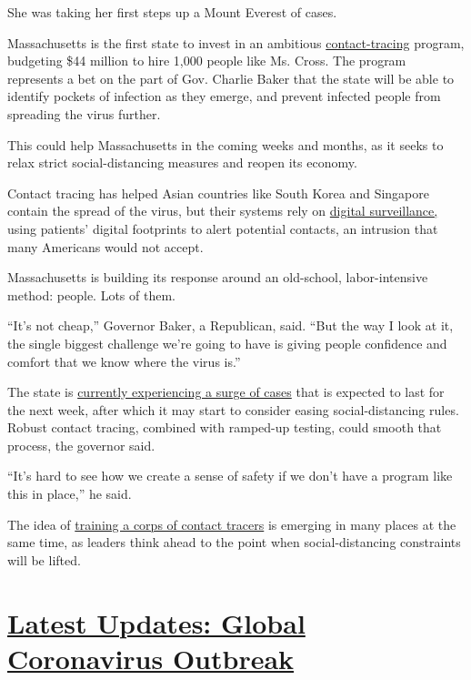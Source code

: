 She was taking her first steps up a Mount Everest of cases.

Massachusetts is the first state to invest in an ambitious
\href{https://www.nytimes.com/2020/06/21/nyregion/nyc-contact-tracing.html}{contact-tracing}
program, budgeting \$44 million to hire 1,000 people like Ms. Cross. The
program represents a bet on the part of Gov. Charlie Baker that the
state will be able to identify pockets of infection as they emerge, and
prevent infected people from spreading the virus further.

This could help Massachusetts in the coming weeks and months, as it
seeks to relax strict social-distancing measures and reopen its economy.

Contact tracing has helped Asian countries like South Korea and
Singapore contain the spread of the virus, but their systems rely on
\href{https://science.sciencemag.org/content/early/2020/04/09/science.abb6936}{digital
surveillance,} using patients' digital footprints to alert potential
contacts, an intrusion that many Americans would not accept.

Massachusetts is building its response around an old-school,
labor-intensive method: people. Lots of them.

``It's not cheap,'' Governor Baker, a Republican, said. ``But the way I
look at it, the single biggest challenge we're going to have is giving
people confidence and comfort that we know where the virus is.''

The state is
\href{https://www.nbcboston.com/news/local/mass-gov-baker-to-provide-update-on-coronavirus-response-2/2107985/}{currently
experiencing a surge of cases} that is expected to last for the next
week, after which it may start to consider easing social-distancing
rules. Robust contact tracing, combined with ramped-up testing, could
smooth that process, the governor said.

``It's hard to see how we create a sense of safety if we don't have a
program like this in place,'' he said.

The idea of
\href{https://www.theguardian.com/world/2020/apr/04/recruit-volunteer-army-to-trace-coronavirus-contacts-now-urge-top-scientists}{training
a corps of contact tracers} is emerging in many places at the same time,
as leaders think ahead to the point when social-distancing constraints
will be lifted.

\hypertarget{latest-updates-global-coronavirus-outbreak}{%
\section{\texorpdfstring{\href{https://www.nytimes.com/2020/08/01/world/coronavirus-covid-19.html?action=click\&pgtype=Article\&state=default\&region=MAIN_CONTENT_1\&context=storylines_live_updates}{Latest
Updates: Global Coronavirus
Outbreak}}{Latest Updates: Global Coronavirus Outbreak}}\label{latest-updates-global-coronavirus-outbreak}}


